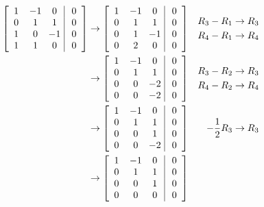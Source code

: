\begin{solution}
\begin{enumerate}[label=(\alph*)]
    \begin{align*}
    \left[
    \begin{array}{@{\;}wc{10pt}wc{10pt}wc{10pt}|wc{10pt}@{\;}}
    1 & -1 & 0 & 0 \\
    0 & 1 & 1 & 0\\
    1 & 0 & -1 & 0\\
    1 & 1 & 0 & 0
    \end{array}
    \right] &\to 
    \left[\begin{array}{@{\;}wc{10pt}wc{10pt}wc{10pt}|wc{10pt}@{\;}}
    1 & -1 & 0 & 0 \\
    0 & 1 & 1 & 0\\
    0 & 1 & -1 & 0\\
    0 & 2 & 0 & 0
    \end{array}\right] & 
    \begin{aligned}
    R_3 - R_1 &\to R_3 \\
    R_4 - R_1 &\to R_4 \\
    \end{aligned}\\
    &\to 
    \left[\begin{array}{@{\;}wc{10pt}wc{10pt}wc{10pt}|wc{10pt}@{\;}}
    1 & -1 & 0 & 0 \\
    0 & 1 & 1 & 0\\
    0 & 0 & -2 & 0\\
    0 & 0 & -2 & 0
    \end{array}\right] & 
    \begin{aligned}
    R_3 - R_2 &\to R_3 \\
    R_4 - R_2 &\to R_4 \\
    \end{aligned}\\
    &\to 
    \left[\begin{array}{@{\;}wc{10pt}wc{10pt}wc{10pt}|wc{10pt}@{\;}}
    1 & -1 & 0 & 0 \\
    0 & 1 & 1 & 0\\
    0 & 0 & 1 & 0\\
    0 & 0 & -2 & 0
    \end{array}\right] & 
    -\frac{1}{2}R_3 \to R_3 \\
    &\to 
    \left[\begin{array}{@{\;}wc{10pt}wc{10pt}wc{10pt}|wc{10pt}@{\;}}
    1 & -1 & 0 & 0 \\
    0 & 1 & 1 & 0\\
    0 & 0 & 1 & 0\\
    0 & 0 & 0 & 0
    \end{array}\right] & 

\end{align*}
\end{enumerate}
\end{solution}
